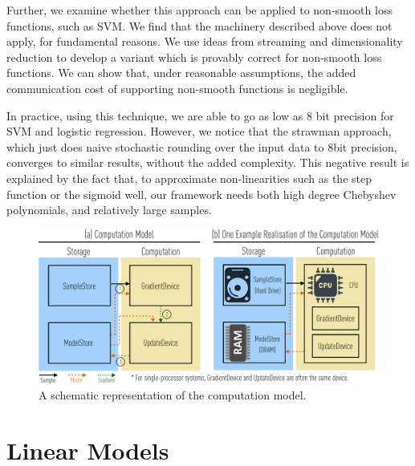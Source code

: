 \documentclass{article}
\begin{document}
Further, we examine whether this approach can be applied to non-smooth loss functions, such as SVM. 
We find that the  machinery described above does not apply, for fundamental reasons. 
We use ideas from streaming and dimensionality reduction to develop a variant which is provably correct for non-smooth loss functions. 
We can show that, under reasonable assumptions, the added communication cost of supporting non-smooth functions is negligible. 

\vspace{-0.5em}
In practice, using this technique, we are
able to go as low as 8 bit precision for SVM and logistic regression. 
However, we notice that the strawman approach, which just
does naive stochastic rounding over the input data to 8bit precision, converges to similar results, 
without the added complexity. 
This negative result is explained by the fact that, to approximate non-linearities such as the step function or the sigmoid well, our framework needs both high degree Chebyshev polynomials, and relatively large samples. 

\begin{figure}[t]
\centering   
\includegraphics[scale=0.27]{compmodel-pdfcrop}
\vspace{-1em}
\caption{A schematic representation of the computation model.}
\vspace{-0.5em}
\label{fig:model}
\end{figure}


\vspace{-0.5em}
\section{Linear Models}
\end{document}
